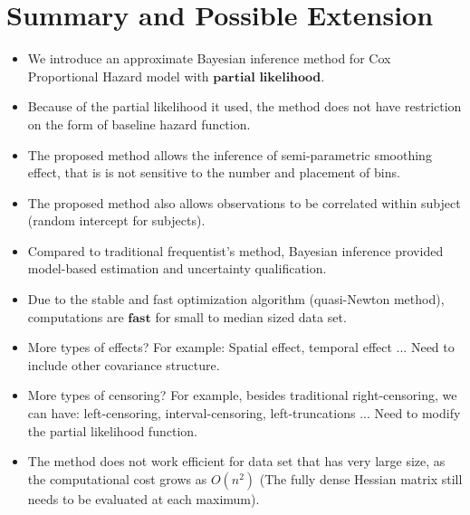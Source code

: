 \documentclass{beamer} %
\begin{document}
\section{Summary and Possible Extension}
\begin{frame}
\begin{itemize}
\item We introduce an approximate Bayesian inference method for Cox Proportional Hazard model with $\textbf{partial likelihood}$.
\pause
\item Because of the partial likelihood it used, the method does not have restriction on the form of baseline hazard function.
\pause
\item The proposed method allows the inference of semi-parametric smoothing effect, that is is not sensitive to the number and placement of bins.
\pause
\item The proposed method also allows observations to be correlated within subject (random intercept for subjects).
\pause
\item Compared to traditional frequentist's method, Bayesian inference provided model-based estimation and uncertainty
qualification.
\pause
\item Due to the stable and fast optimization algorithm (quasi-Newton method),  computations are $\textbf{fast}$ for small to median sized data set.
\end{itemize}
\end{frame}

\begin{frame}
\begin{itemize}
\item More types of effects? For example: Spatial effect, temporal effect ... 
\pause
Need to include other covariance structure.
\pause
\item More types of censoring? For example, besides traditional right-censoring, we can have: left-censoring, interval-censoring, left-truncations ... 
\pause
Need to modify the partial likelihood function. 
\pause
\item The method does not work efficient for data set that has very large size, as the computational cost grows as $O(n^2)$ (The fully dense Hessian matrix still needs to be evaluated at each maximum).
\end{itemize}
\end{frame}

\begin{frame}


\end{frame}
\end{document}
